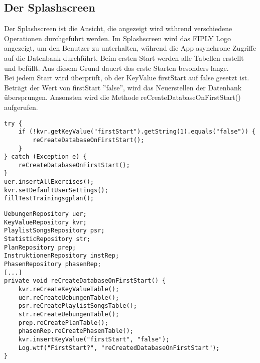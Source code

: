 \documentclass[FIPLY_base.tex]{subfiles}
\begin{document}
\subsection{Der Splashscreen}
Der Splashscreen ist die Ansicht, die angezeigt wird während verschiedene Operationen durchgeführt werden.
Im Splashscreen wird das FIPLY Logo angezeigt, um den Benutzer zu unterhalten, 
während die App asynchrone Zugriffe auf die Datenbank durchführt.
Beim ersten Start werden alle Tabellen erstellt und befüllt.
Aus diesem Grund dauert das erste Starten besonders lange.
\ \\
Bei jedem Start wird überprüft, ob der KeyValue firstStart auf false gesetzt ist.
Beträgt der Wert von firstStart ''false'', wird das Neuerstellen der Datenbank übersprungen.
Ansonsten wird die Methode reCreateDatabaseOnFirstStart() aufgerufen.
\begin{lstlisting}[caption={Abfrage ob die App zum Ersten mal ausgeführt wird},label=DescriptiveLabel]
try {
	if (!kvr.getKeyValue("firstStart").getString(1).equals("false")) {
		reCreateDatabaseOnFirstStart();
	}
} catch (Exception e) {
	reCreateDatabaseOnFirstStart();
}
uer.insertAllExercises();
kvr.setDefaultUserSettings();
fillTestTrainingsgplan();
\end{lstlisting}
\begin{lstlisting}[caption={Die reCreateDatabaseOnFirstStart()-Methode löscht alle Tabellen und erstellt diese neu},label=DescriptiveLabel]
UebungenRepository uer;
KeyValueRepository kvr;
PlaylistSongsRepository psr;
StatisticRepository str;
PlanRepository prep;
InstruktionenRepository instRep;
PhasenRepository phasenRep;
[...]
private void reCreateDatabaseOnFirstStart() {
	kvr.reCreateKeyValueTable();
	uer.reCreateUebungenTable();
	psr.reCreatePlaylistSongsTable();
	str.reCreateUebungenTable();
	prep.reCreatePlanTable();
	phasenRep.reCreatePhasenTable();
	kvr.insertKeyValue("firstStart", "false");
	Log.wtf("FirstStart?", "reCreatedDatabaseOnFirstStart");
}
\end{lstlisting}
\end{document}
